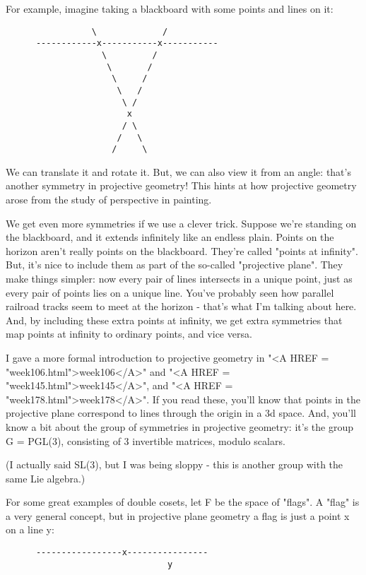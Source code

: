 For example, imagine taking a blackboard with some points and lines 
on it:


\begin{verbatim}
                 \             /
      ------------x-----------x-----------
                   \         /
                    \       /
                     \     /
                      \   /
                       \ /
                        x
                       / \
                      /   \
                     /     \
\end{verbatim}
    

We can translate it and rotate it.  But, we can also view it from
an angle: that's another symmetry in projective geometry!  This
hints at how projective geometry arose from the study of perspective 
in painting.  

We get even more symmetries if we use a clever trick.  Suppose we're
standing on the blackboard, and it extends infinitely like an endless
plain.  Points on the horizon aren't really points on the blackboard.
They're called "points at infinity".  But, it's nice to
include them as part of the so-called "projective plane".
They make things simpler: now every pair of lines intersects in a
unique point, just as every pair of points lies on a unique line.
You've probably seen how parallel railroad tracks seem to meet at the
horizon - that's what I'm talking about here.  And, by including these
extra points at infinity, we get extra symmetries that map points at
infinity to ordinary points, and vice versa.

I gave a more formal introduction to projective geometry in "<A
HREF = "week106.html">week106</A>" and "<A HREF =
"week145.html">week145</A>", and "<A HREF =
"week178.html">week178</A>".  If you read these, you'll know that
points in the projective plane correspond to lines through the origin
in a 3d space.  And, you'll know a bit about the group of symmetries
in projective geometry: it's the group G = PGL(3), consisting of 3
invertible matrices, modulo scalars.  

(I actually said SL(3), but I
was being sloppy - this is another group with the same Lie algebra.)

For some great examples of double cosets, let F be the space of
"flags".  A "flag" is a very general concept, but
in projective plane geometry a flag is just a point x on a line y:

\begin{verbatim}
      -----------------x----------------
                                y
\end{verbatim}
    
